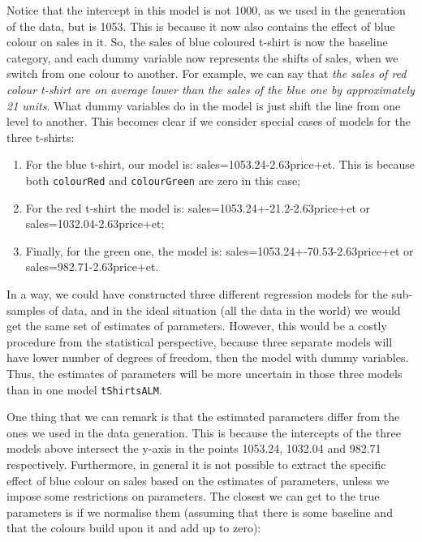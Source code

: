 \documentclass[
]{book}
\providecommand{\tightlist}{%
  \setlength{\itemsep}{0pt}\setlength{\parskip}{0pt}}
\theoremstyle{definition}
\theoremstyle{definition}
\theoremstyle{definition}
\theoremstyle{definition}
\theoremstyle{remark}
\begin{document}
Notice that the intercept in this model is not 1000, as we used in the generation of the data, but is 1053. This is because it now also contains the effect of blue colour on sales in it. So, the sales of blue coloured t-shirt is now the baseline category, and each dummy variable now represents the shifts of sales, when we switch from one colour to another. For example, we can say that \emph{the sales of red colour t-shirt are on average lower than the sales of the blue one by approximately 21 units}. What dummy variables do in the model is just shift the line from one level to another. This becomes clear if we consider special cases of models for the three t-shirts:

\begin{enumerate}
\def\labelenumi{\arabic{enumi}.}
\tightlist
\item
  For the blue t-shirt, our model is: sales=1053.24-2.63price+et. This is because both \texttt{colourRed} and \texttt{colourGreen} are zero in this case;
\item
  For the red t-shirt the model is: sales=1053.24+-21.2-2.63price+et or sales=1032.04-2.63price+et;
\item
  Finally, for the green one, the model is: sales=1053.24+-70.53-2.63price+et or sales=982.71-2.63price+et.
\end{enumerate}

In a way, we could have constructed three different regression models for the sub-samples of data, and in the ideal situation (all the data in the world) we would get the same set of estimates of parameters. However, this would be a costly procedure from the statistical perspective, because three separate models will have lower number of degrees of freedom, then the model with dummy variables. Thus, the estimates of parameters will be more uncertain in those three models than in one model \texttt{tShirtsALM}.

One thing that we can remark is that the estimated parameters differ from the ones we used in the data generation. This is because the intercepts of the three models above intersect the y-axis in the points 1053.24, 1032.04 and 982.71 respectively. Furthermore, in general it is not possible to extract the specific effect of blue colour on sales based on the estimates of parameters, unless we impose some restrictions on parameters. The closest we can get to the true parameters is if we normalise them (assuming that there is some baseline and that the colours build upon it and add up to zero):
\end{document}
